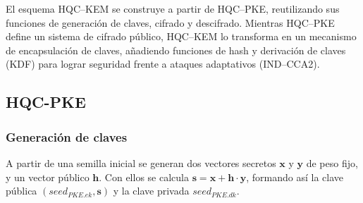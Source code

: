 El esquema HQC–KEM se construye a partir de HQC–PKE, reutilizando sus funciones de generación de claves, cifrado y descifrado. 
Mientras HQC–PKE define un sistema de cifrado público, HQC–KEM lo transforma en un mecanismo de encapsulación de claves, 
añadiendo funciones de hash y derivación de claves (KDF) para lograr seguridad frente a ataques adaptativos (IND–CCA2).

\subsection{HQC-PKE}

\subsubsection{Generación de claves}
A partir de una semilla inicial se generan dos vectores secretos $\mathbf{x}$ y $\mathbf{y}$ de peso fijo, y un vector público $\mathbf{h}$. Con ellos se calcula $\mathbf{s} = \mathbf{x} + \mathbf{h}\cdot\mathbf{y}$, formando así la clave pública $(\textit{seed}_{PKE.ek}, \mathbf{s})$ y la clave privada $\textit{seed}_{PKE.dk}$.


\newcommand{\triComment}[1]{\Statex $\triangleright$ \textit{#1}}


